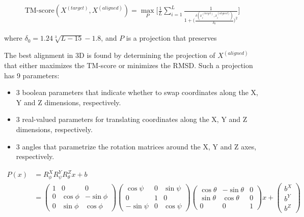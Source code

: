    \begin{align}
        \text{TM-score}(X^{(target)}, X^{(aligned)}) = \max_P \Bigg[ \frac{1}{L} \sum\limits_{i=1}^L
            \frac{1}{1 + \Big(\frac{\delta(x_i^{(target)}, x_i^{(aligned)})}{\delta_0}\Big)^2} \Bigg]
    \end{align}

    where $\delta_0 = 1.24 \sqrt[3]{L - 15} - 1.8$, and $P$ is a projection that preserves

    The best alignment in 3D is found by determining the projection of $X^{(aligned)}$ that
    either maximizes the TM-score or minimizes the RMSD.
    Such a projection has 9 parameters:
    \begin{itemize}
        \item 3 boolean parameters that indicate whether to swap coordinates along
        the X, Y and Z dimensions, respectively.
        \item 3 real-valued parameters for translating coordinates along the X, Y and Z
        dimensions, respectively.
        \item 3 angles that parametrize the rotation matrices around the X, Y and Z axes,
        respectively.
    \end{itemize}

    \begin{align*}
        P(x) & = R^X_{\phi} R^Y_{\psi} R^Z_{\theta} x + b \\
        & =
        \begin{pmatrix}
        1 & 0 & 0 \\
        0 & \cos{\phi} & -\sin{\phi} \\
        0 & \sin{\phi} & \cos{\phi}
        \end{pmatrix}
        \begin{pmatrix}
        \cos{\psi} & 0 & \sin{\psi} \\
        0 & 1 & 0 \\
        -\sin{\psi} & 0 & \cos{\psi}
        \end{pmatrix}
        \begin{pmatrix}
        \cos{\theta} & -\sin{\theta} & 0 \\
        \sin{\theta} & \cos{\theta} & 0 \\
        0 & 0 & 1
        \end{pmatrix}
        x +
        \begin{pmatrix}
        b^X \\
        b^Y \\
        b^Z
        \end{pmatrix}
    \end{align*}

